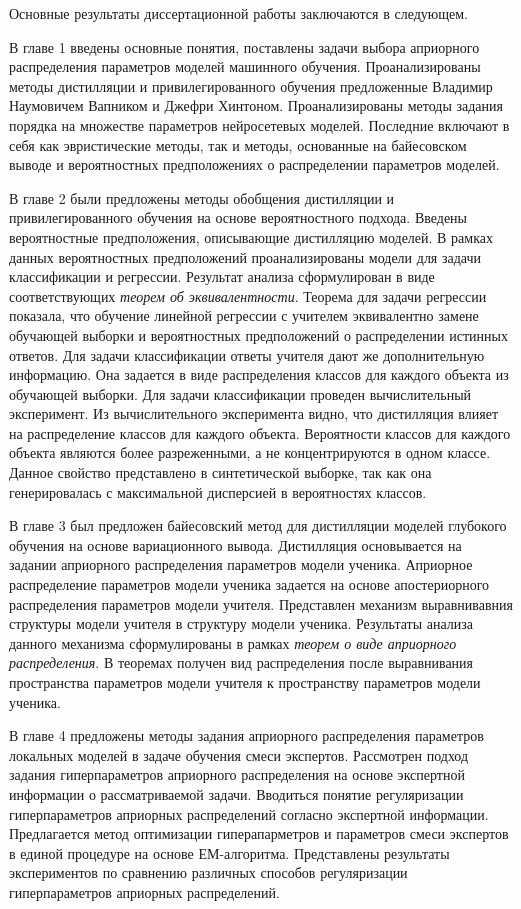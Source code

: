 Основные результаты диссертационной работы заключаются в следующем.

В главе 1 введены основные понятия, поставлены задачи выбора априорного распределения параметров моделей машинного обучения. Проанализированы методы дистилляции и привилегированного обучения предложенные Владимир Наумовичем Вапником и Джефри Хинтоном. Проанализированы методы задания порядка на множестве параметров нейросетевых моделей. Последние включают в себя как эвристические методы, так и методы, основанные на байесовском выводе и вероятностных предположениях о распределении параметров моделей.

В главе 2 были предложены методы обобщения дистилляции и привилегированного обучения на основе вероятностного подхода. Введены вероятностные предположения, описывающие дистилляцию моделей. В рамках данных вероятностных предположений проанализированы модели для задачи классификации и регрессии. Результат анализа сформулирован в виде  соответствующих \emph{теорем об эквивалентности}. Теорема для задачи регрессии показала, что обучение линейной регрессии с учителем эквивалентно замене обучающей выборки и вероятностных предположений о распределении истинных ответов. Для задачи классификации ответы учителя дают же дополнительную информацию. Она задается в виде распределения классов для каждого объекта из обучающей выборки. Для задачи классификации проведен вычислительный эксперимент. Из вычислительного эксперимента видно, что дистилляция влияет на распределение классов для каждого объекта. Вероятности классов для каждого объекта являются более разреженными, а не концентрируются в одном классе. Данное свойство представлено в синтетической выборке, так как она генерировалась с максимальной дисперсией в вероятностях классов.

В главе 3 был предложен байесовский метод для дистилляции моделей глубокого обучения на основе вариационного вывода. Дистилляция основывается на задании априорного распределения параметров модели ученика. Априорное распределение параметров модели ученика задается на основе апостериорного распределения параметров модели учителя. Представлен механизм выравнивавния структуры модели учителя в структуру модели ученика. Результаты анализа данного механизма сформулированы в рамках \emph{теорем о виде априорного распределения}. В теоремах получен вид распределения после выравнивания пространства параметров модели учителя к пространству параметров модели ученика.

В главе 4 предложены методы задания априорного распределения параметров локальных моделей в задаче обучения смеси экспертов. Рассмотрен подход задания гиперпараметров априорного распределения на основе экспертной информации о рассматриваемой задачи. Вводиться понятие регуляризации гиперпараметров априорных распределений согласно экспертной информации. Предлагается метод оптимизации гиперапарметров и параметров смеси экспертов в единой процедуре на основе ЕМ-алгоритма. Представлены результаты экспериментов по сравнению различных способов регуляризации гиперпараметров априорных распределений.

